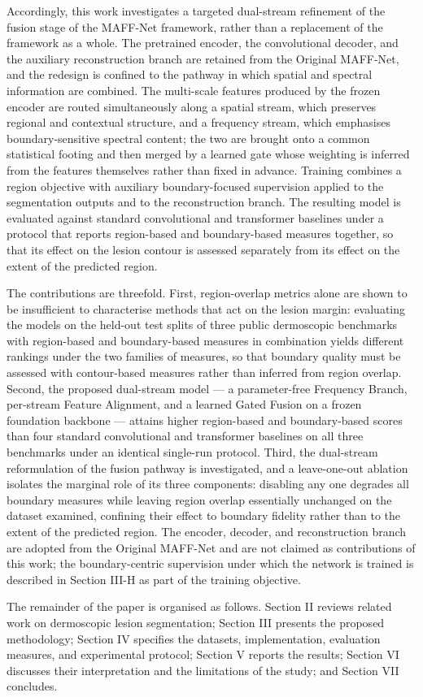 Accordingly, this work investigates a targeted dual-stream refinement of the fusion stage of the MAFF-Net framework, rather than a replacement of the framework as a whole. The pretrained encoder, the convolutional decoder, and the auxiliary reconstruction branch are retained from the Original MAFF-Net, and the redesign is confined to the pathway in which spatial and spectral information are combined. The multi-scale features produced by the frozen encoder are routed simultaneously along a spatial stream, which preserves regional and contextual structure, and a frequency stream, which emphasises boundary-sensitive spectral content; the two are brought onto a common statistical footing and then merged by a learned gate whose weighting is inferred from the features themselves rather than fixed in advance. Training combines a region objective with auxiliary boundary-focused supervision applied to the segmentation outputs and to the reconstruction branch. The resulting model is evaluated against standard convolutional and transformer baselines under a protocol that reports region-based and boundary-based measures together, so that its effect on the lesion contour is assessed separately from its effect on the extent of the predicted region.

The contributions are threefold. First, region-overlap metrics alone are shown to be insufficient to characterise methods that act on the lesion margin: evaluating the models on the held-out test splits of three public dermoscopic benchmarks with region-based and boundary-based measures in combination yields different rankings under the two families of measures, so that boundary quality must be assessed with contour-based measures rather than inferred from region overlap. Second, the proposed dual-stream model --- a parameter-free Frequency Branch, per-stream Feature Alignment, and a learned Gated Fusion on a frozen foundation backbone --- attains higher region-based and boundary-based scores than four standard convolutional and transformer baselines on all three benchmarks under an identical single-run protocol. Third, the dual-stream reformulation of the fusion pathway is investigated, and a leave-one-out ablation isolates the marginal role of its three components: disabling any one degrades all boundary measures while leaving region overlap essentially unchanged on the dataset examined, confining their effect to boundary fidelity rather than to the extent of the predicted region. The encoder, decoder, and reconstruction branch are adopted from the Original MAFF-Net and are not claimed as contributions of this work; the boundary-centric supervision under which the network is trained is described in Section III-H as part of the training objective.

The remainder of the paper is organised as follows. Section II reviews related work on dermoscopic lesion segmentation; Section III presents the proposed methodology; Section IV specifies the datasets, implementation, evaluation measures, and experimental protocol; Section V reports the results; Section VI discusses their interpretation and the limitations of the study; and Section VII concludes.
